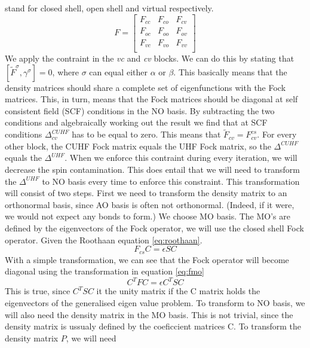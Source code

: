 \documentclass[twoside,twocolumn,9pt]{article}
\begin{document}
stand for closed shell, open shell and virtual respectively.
\begin{equation}\label{eq:fockblock}
  F = \begin{bmatrix}
    F_{cc} & F_{co} & F_{cv} \\
    F_{oc} & F_{oo} & F_{ov} \\
    F_{vc} & F_{vo} & F_{vv} \\
  \end{bmatrix}
\end{equation}
We apply the contraint in the \textit{vc} and \textit{cv} blocks. We can do this by stating that $[\tilde{F}^\sigma, \gamma^\sigma] = 0$, where $\sigma$ can equal either $\alpha$
or $\beta$. This basically means that the density matrices should share a complete set of eigenfunctions with the Fock matrices. This, in turn, means that the Fock matrices should be
diagonal at self consistent field (SCF) conditions in the NO basis. By subtracting the two conditions and algebraically working out the result we find that at SCF conditions
$\Delta^{CUHF}_{cv}$ has to be equal to zero. This means that $\tilde{F}_{cv} = F_{cv}^{cs}$\cite{Scuseria2010}. For every other block, the CUHF Fock matrix equals the UHF Fock matrix,
so the $\Delta^{CUHF}$ equals the $\Delta^{UHF}$. When we enforce this contraint during every iteration, we will decrease the spin contamination. This does entail that we will need
to transform the $\Delta^{UHF}$ to NO basis every time to enforce this constraint. This transformation will consist of two steps. First we need to transform the density matrix to
an orthonormal basis, since AO basis is often not orthonormal. (Indeed, if it were, we would not expect any bonds to form.) We choose MO basis. The MO's are defined by the
eigenvectors of the Fock operator, we will use the closed shell Fock operator. Given the Roothaan equation \eqref{eq:roothaan}.
\begin{equation}\label{eq:roothaan}
  F_{cs}C = \epsilon S C
\end{equation}
With a simple transformation, we can see that the Fock operator will become diagonal using the transformation in equation \eqref{eq:fmo}
\begin{equation}\label{eq:fmo}
  C^T F C = \epsilon C^T S C
\end{equation}
This is true, since $C^T S C$ it the unity matrix if the C matrix holds the eigenvectors of the generalised eigen value problem. To transform to NO basis, we will also need the
density matrix in the MO basis. This is not trivial, since the density matrix is ussualy defined by the coeficcient matrices C. To transform the density matrix $P$, we will need
\end{document}
